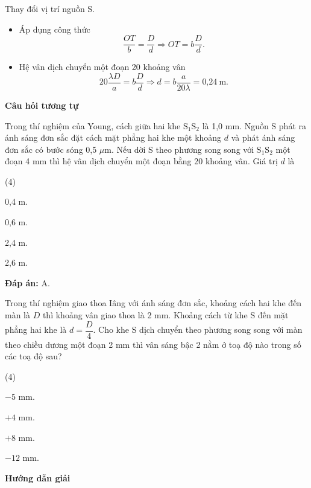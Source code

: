 \begin{dang}{Thay đổi vị trí nguồn S.}
{		\begin{itemize}
			\item  Áp dụng công thức
			\begin{equation*}
				\dfrac{OT}{b}=\dfrac{D}{d} \Rightarrow OT=b\dfrac{D}{d}.
			\end{equation*}
			\item Hệ vân dịch chuyển một đoạn 20 khoảng vân
			\begin{equation*}
				20 \dfrac{\lambda D}{a}=b\dfrac{D}{d}\Rightarrow d=b\dfrac{a}{20\lambda}=\text{0,24}\ \text{m}.
			\end{equation*}
		\end{itemize}
		\begin{center}
			\textbf{Câu hỏi tương tự}
		\end{center}
		
		Trong thí nghiệm của Young, cách giữa hai khe $\text{S}_1\text{S}_2$ là 1,0 mm. Nguồn S phát ra ánh sáng đơn sắc đặt cách mặt phẳng hai khe một khoảng $d$ và phát ánh sáng đơn sắc có bước sóng 0,5 $\mu$m. Nếu dời S theo phương song song với $\text{S}_1\text{S}_2$ một đoạn 4 mm thì hệ vân dịch chuyển một đoạn bằng 20 khoảng vân. Giá trị $d$ là 
		\begin{mcq}(4)
			\item 0,4 m.			
			\item 0,6 m.			
			\item 2,4 m.			
			\item 2,6 m.
		\end{mcq}
		
		\textbf{Đáp án:} A.
	}
	
	{Trong thí nghiệm giao thoa Iâng với ánh sáng đơn sắc, khoảng cách hai khe đến màn là $D$ thì khoảng vân giao thoa là 2 mm. Khoảng cách từ khe S đến mặt phẳng hai khe là $d = \dfrac{D}{4}$. Cho khe S dịch chuyển theo phương song song với màn theo chiều dương một đoạn 2 mm thì vân sáng bậc 2 nằm ở toạ độ nào trong số các toạ độ sau?
		\begin{mcq}(4)
			\item $- 5$ mm.			
			\item $+ 4$ mm.			
			\item $+ 8$ mm.			
			\item $- 12$ mm.
		\end{mcq}
	}
	{\begin{center}
			\textbf{Hướng dẫn giải}
		\end{center}
		
}
\end{dang}
